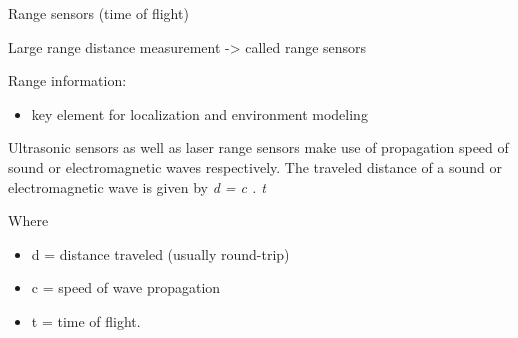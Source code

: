 \documentclass[compress]{beamer}
\providecommand{\tightlist}{%
  \setlength{\itemsep}{0pt}\setlength{\parskip}{0pt}}
\begin{document}
\begin{frame}{Range sensors (time of flight)}

Large range distance measurement -\textgreater{} called range sensors

Range information:

\begin{itemize}
\tightlist
\item
  key element for localization and environment modeling
\end{itemize}

Ultrasonic sensors as well as laser range sensors make use of
propagation speed of sound or electromagnetic waves respectively. The
traveled distance of a sound or electromagnetic wave is given by \emph{d
= c . t}

Where

\begin{itemize}
\tightlist
\item
  d = distance traveled (usually round-trip)
\item
  c = speed of wave propagation
\item
  t = time of flight.
\end{itemize}

\end{frame}
\end{document}
